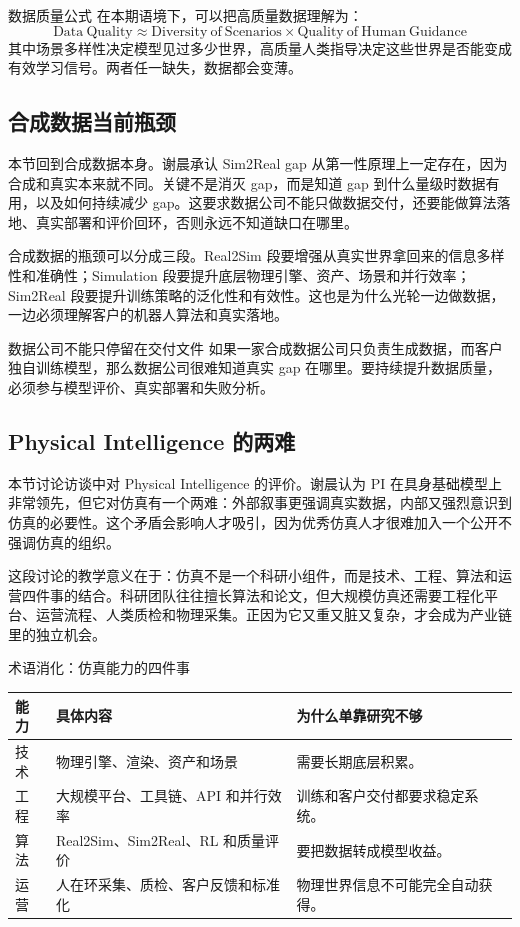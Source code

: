 \begin{importantbox}{数据质量公式}
在本期语境下，可以把高质量数据理解为：
\[
\mathrm{Data\ Quality}\approx \mathrm{Diversity\ of\ Scenarios}\times \mathrm{Quality\ of\ Human\ Guidance}
\]
其中场景多样性决定模型见过多少世界，高质量人类指导决定这些世界是否能变成有效学习信号。两者任一缺失，数据都会变薄。
\end{importantbox}

\subsection{合成数据当前瓶颈}

本节回到合成数据本身。谢晨承认 Sim2Real gap 从第一性原理上一定存在，因为合成和真实本来就不同。关键不是消灭 gap，而是知道 gap 到什么量级时数据有用，以及如何持续减少 gap。这要求数据公司不能只做数据交付，还要能做算法落地、真实部署和评价回环，否则永远不知道缺口在哪里。

合成数据的瓶颈可以分成三段。Real2Sim 段要增强从真实世界拿回来的信息多样性和准确性；Simulation 段要提升底层物理引擎、资产、场景和并行效率；Sim2Real 段要提升训练策略的泛化性和有效性。这也是为什么光轮一边做数据，一边必须理解客户的机器人算法和真实落地。

\begin{warningbox}{数据公司不能只停留在交付文件}
如果一家合成数据公司只负责生成数据，而客户独自训练模型，那么数据公司很难知道真实 gap 在哪里。要持续提升数据质量，必须参与模型评价、真实部署和失败分析。
\end{warningbox}

\subsection{Physical Intelligence 的两难}

本节讨论访谈中对 Physical Intelligence 的评价。谢晨认为 PI 在具身基础模型上非常领先，但它对仿真有一个两难：外部叙事更强调真实数据，内部又强烈意识到仿真的必要性。这个矛盾会影响人才吸引，因为优秀仿真人才很难加入一个公开不强调仿真的组织。

这段讨论的教学意义在于：仿真不是一个科研小组件，而是技术、工程、算法和运营四件事的结合。科研团队往往擅长算法和论文，但大规模仿真还需要工程化平台、运营流程、人类质检和物理采集。正因为它又重又脏又复杂，才会成为产业链里的独立机会。

\begin{knowledgebox}{术语消化：仿真能力的四件事}
\begin{tabularx}{\textwidth}{p{}p{}X}
\toprule
能力 & 具体内容 & 为什么单靠研究不够 \\
\midrule
技术 & 物理引擎、渲染、资产和场景 & 需要长期底层积累。 \\
工程 & 大规模平台、工具链、API 和并行效率 & 训练和客户交付都要求稳定系统。 \\
算法 & Real2Sim、Sim2Real、RL 和质量评价 & 要把数据转成模型收益。 \\
运营 & 人在环采集、质检、客户反馈和标准化 & 物理世界信息不可能完全自动获得。 \\
\bottomrule
\end{tabularx}
\end{knowledgebox}

